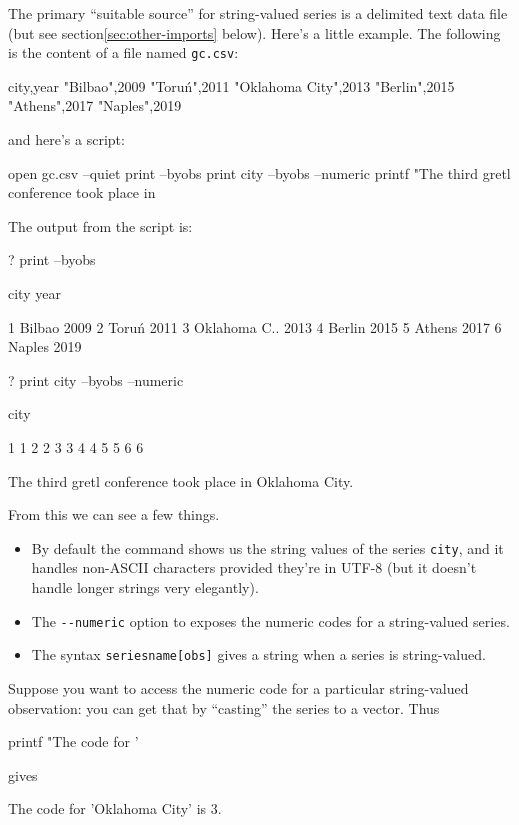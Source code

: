 The primary ``suitable source'' for string-valued series is a
delimited text data file (but see section\ref{sec:other-imports}
below). Here's a little example. The following is the content of a
file named \texttt{gc.csv}:
%
\begin{code}
city,year
"Bilbao",2009
"Toruń",2011
"Oklahoma City",2013
"Berlin",2015
"Athens",2017
"Naples",2019
\end{code}
%
and here's a script:
%
\begin{code}
open gc.csv --quiet
print --byobs
print city --byobs --numeric
printf "The third gretl conference took place in %
\end{code}

The output from the script is:
%
\begin{code}
? print --byobs

          city         year

1       Bilbao         2009
2        Toruń         2011
3 Oklahoma C..         2013
4       Berlin         2015
5       Athens         2017
6       Naples         2019

? print city --byobs --numeric

          city

1            1
2            2
3            3
4            4
5            5
6            6

The third gretl conference took place in Oklahoma City.
\end{code}

From this we can see a few things. 
\begin{itemize}
\item By default the  command shows us the string values
  of the series \texttt{city}, and it handles non-ASCII characters
  provided they're in UTF-8 (but it doesn't handle longer strings
  very elegantly).
\item The \verb|--numeric| option to  exposes the
  numeric codes for a string-valued series.
\item The syntax \texttt{seriesname[obs]} gives a string when a series
  is string-valued.
\end{itemize}

Suppose you want to access the numeric code for a particular
string-valued observation: you can get that by ``casting'' the series
to a vector. Thus
\begin{code}
printf "The code for '%
\end{code}
gives
\begin{code}
The code for 'Oklahoma City' is 3.
\end{code}

